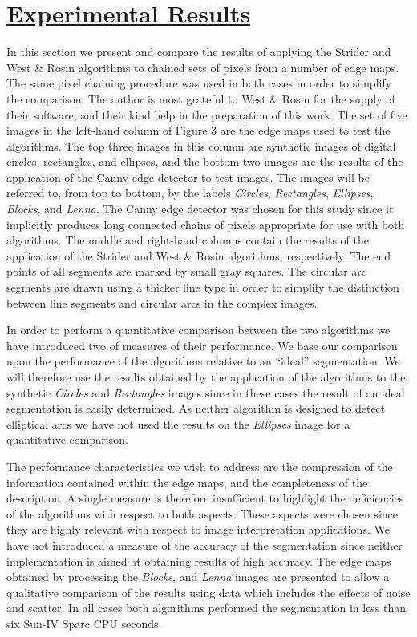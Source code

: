 \section{\underline{Experimental Results}}

 In this section we present and compare the results of applying the Strider 
and West \& Rosin algorithms to chained sets of pixels from 
a number of edge maps. The same pixel chaining procedure was used in both 
cases in order to simplify the comparison. The author is most grateful to 
West \& Rosin for the supply of their software, and their kind help in the 
preparation of this work. The set of five images in the left-hand column of 
Figure 3 are the edge maps used to test the algorithms. The top 
three images in this column are synthetic images of digital circles, 
rectangles, and ellipses, and the bottom two images are the results of the 
application of the Canny \cite{canny86} edge detector to test images. The 
images will be referred to, from top to bottom, by the labels {\it Circles}, 
{\it Rectangles}, {\it Ellipses}, {\it Blocks}, and {\it Lenna}. The Canny 
edge detector was chosen for this study since it implicitly produces long 
connected chains of pixels appropriate for use with both algorithms. The 
middle and right-hand columns contain the results of the application of the 
Strider and West \& Rosin algorithms, respectively. The end points of all segments are 
marked by small gray squares. The circular arc segments are drawn using a 
thicker line type in order to simplify the distinction between line segments 
and circular arcs in the complex images.

 In order to perform a quantitative comparison between the two algorithms we
have introduced two of measures of their performance. We base our 
comparison upon the performance of the algorithms relative to an ``ideal'' 
segmentation. We will therefore use the results obtained by the 
application of the algorithms to the synthetic {\it Circles} and 
{\it Rectangles} images since in these cases the result of an ideal 
segmentation is easily determined. As neither algorithm is designed to detect 
elliptical arcs we have not used the results on the {\it Ellipses} image for a
quantitative comparison.

 The performance characteristics we wish to address are the compression of the 
information contained within the edge maps, and the completeness of the 
description. A single measure is therefore insufficient to highlight the 
deficiencies of the algorithms with respect to both aspects. These aspects 
were chosen since they are highly relevant with respect to image interpretation
applications. We have not introduced a measure of the accuracy of the 
segmentation since neither implementation is aimed at obtaining results of 
high accuracy. The edge maps obtained by processing the {\it Blocks}, and 
{\it Lenna} images are presented to allow a qualitative comparison of the 
results using data which includes the effects of noise and scatter. In all 
cases both algorithms performed the segmentation in less than six Sun-IV Sparc 
CPU seconds.


